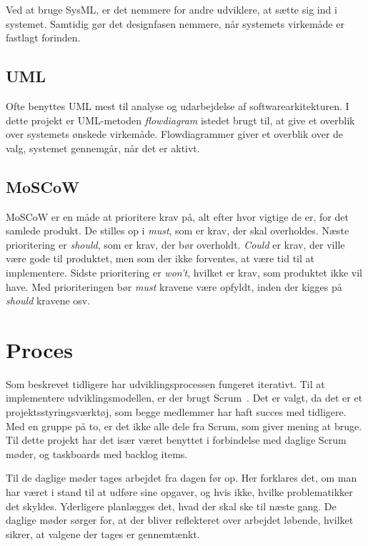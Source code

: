 \noindent Ved at bruge SysML, er det nemmere for andre udviklere, at sætte sig ind i systemet. Samtidig gør det designfasen nemmere, når systemets virkemåde er fastlagt forinden.

\subsection{UML}
Ofte benyttes UML mest til analyse og udarbejdelse af softwarearkitekturen. I dette projekt er UML-metoden \textit{flowdiagram} istedet brugt til, at give et overblik over systemets ønskede virkemåde. Flowdiagrammer giver et overblik over de valg, systemet gennemgår, når det er aktivt.   

\subsection{MoSCoW} 
MoSCoW er en måde at prioritere krav på, alt efter hvor vigtige de er, for det samlede produkt.  
De stilles op i \textit{must}, som er krav, der skal overholdes. Næste prioritering er \textit{should}, som er krav, der bør overholdt. \textit{Could} er krav, der ville være gode til produktet, men som der ikke forventes, at være tid til at implementere. Sidste prioritering er \textit{won't}, hvilket er krav, som produktet ikke vil have. Med prioriteringen bør \textit{must} kravene være opfyldt, inden der kigges på \textit{should} kravene osv. 

\section{Proces}
Som beskrevet tidligere har udviklingsprocessen fungeret iterativt. Til at implementere udviklingsmodellen, er der brugt Scrum~\cite{Scrum}. Det er valgt, da det er et projektsstyringsværktøj, som begge medlemmer har haft succes med tidligere. Med en gruppe på to, er det ikke alle dele fra Scrum, som giver mening at bruge. Til dette projekt har det især været benyttet i forbindelse med daglige Scrum møder, og taskboards med backlog items. 

Til de daglige møder tages arbejdet fra dagen før op. Her forklares det, om man har været i stand til at udføre sine opgaver, og hvis ikke, hvilke problematikker det skyldes. Yderligere planlægges det, hvad der skal ske til næste gang. De daglige møder sørger for, at der bliver reflekteret over arbejdet løbende, hvilket sikrer, at valgene der tages er gennemtænkt. 

